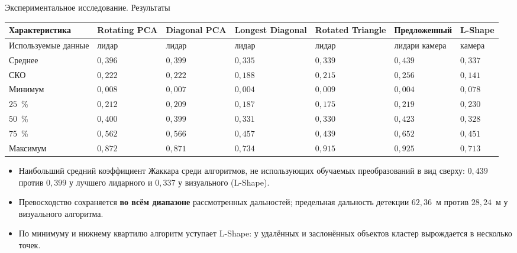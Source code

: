 \begin{frame}{Экспериментальное исследование. Результаты}
	\begin{table}
		\footnotesize
		\centering
		\begin{tabular}{|p{}|p{}|p{}|p{}|p{}|p{}|p{}|}
			\hline
			\textbf{Характе\-ристика} & \textbf{Rotating PCA} & \textbf{Diagonal PCA} & \textbf{Longest Diagonal} & \textbf{Rotated Triangle} & \textbf{Предло\-женный} & \textbf{L-Shape}\\
			\hline
			\tiny Используемые данные & \tiny лидар & \tiny лидар & \tiny лидар & \tiny лидар & \tiny лидар\newline и камера & \tiny камера \\
			\hline
			Среднее & $0,396$ & $0,399$ & $0,335$ & $0,339$ & \boldmath$0,439$ & $0,337$ \\
			\hline
			\tiny СКО & $0,222$ & $0,222$ & $0,188$ & $0,215$ & $0,256$ & \boldmath$0,141$ \\
			\hline
			Минимум & $0,008$ & $0,007$ & $0,004$ & $0,009$ & $0,004$ & \boldmath$0,078$ \\
			\hline
			$25$~\% & $0,212$ & $0,209$ & $0,187$ & $0,175$ & $0,219$ & \boldmath$0,230$ \\
			\hline
			$50$~\% & $0,400$ & $0,399$ & $0,331$ & $0,330$ & \boldmath$0,423$ & $0,328$ \\
			\hline
			$75$~\% & $0,562$ & $0,566$ & $0,457$ & $0,439$ & \boldmath$0,652$ & $0,451$ \\
			\hline
			Максимум & $0,872$ & $0,871$ & $0,734$ & $0,915$ & \boldmath$0,925$ & $0,713$ \\
			\hline
		\end{tabular}
	\end{table}

	\vspace{-0.5em}
	\fontsize{7}{8.4}\selectfont
	\begin{itemize}
		\item Наибольший средний коэффициент Жаккара среди алгоритмов, не использующих обучаемых преобразований в вид сверху: $0,439$ против $0,399$ у лучшего лидарного и $0,337$ у визуального (L-Shape).
		\item Превосходство сохраняется \textbf{во всём диапазоне} рассмотренных дальностей; предельная дальность детекции $62,36$~м против $28,24$~м у визуального алгоритма.
		\item По минимуму и нижнему квартилю алгоритм уступает L-Shape: у удалённых и заслонённых объектов кластер вырождается в несколько точек.
	\end{itemize}
\end{frame}

